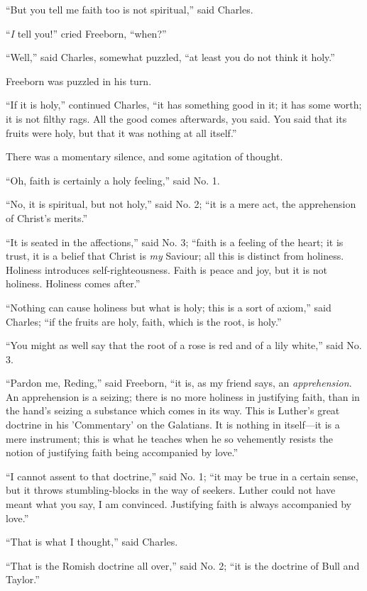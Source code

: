 ``But you tell me faith too is not spiritual,'' said
Charles.

``\emph{I} tell you!'' cried Freeborn, ``when?''

``Well,'' said Charles, somewhat puzzled, ``at least
you do not think it holy.''

Freeborn was puzzled in his turn.

``If it is holy,'' continued Charles, ``it has
something good in it; it has some worth; it is not filthy rags. All
the good comes afterwards, you said. You said that its fruits were
holy, but that it was nothing at all itself.''

There was a momentary silence, and some agitation of thought.

``Oh, faith is certainly a holy feeling,'' said No. 1.

``No, it is spiritual, but not holy,'' said No. 2; ``it
is a mere act, the apprehension of Christ's merits.''

``It is seated in the affections,'' said No. 3; ``faith
is a feeling of the heart; it is trust, it is a belief that Christ is \emph{my}
Saviour; all this is distinct from holiness. Holiness introduces
self-righteousness. Faith is peace and joy, but it is not holiness.
Holiness comes after.''

``Nothing can cause holiness but what is holy; this is a sort
of axiom,'' said Charles; ``if the fruits are holy, faith,
which is the root, is holy.''

``You might as well say that the root of a rose is red and of a
lily white,'' said No. 3.

``Pardon me, Reding,'' said Freeborn, ``it is, as my
friend says, an \emph{apprehension}. An apprehension is a seizing;
there is no more holiness in justifying faith, than in the hand's
seizing a substance which comes in its way. This is Luther's great
doctrine in his 'Commentary' on the Galatians. It is nothing in itself—it
is a mere instrument; this is what he teaches when he so
vehemently resists the notion of justifying faith being accompanied by
love.''

``I cannot assent to that doctrine,'' said No. 1; ``it
may be true in a certain sense, but it throws stumbling-blocks in the
way of seekers. Luther could not have meant what you say, I am
convinced. Justifying faith is always accompanied by love.''

``That is what I thought,'' said Charles.

``That is the Romish doctrine all over,'' said No. 2;
``it is the doctrine of Bull and Taylor.''

